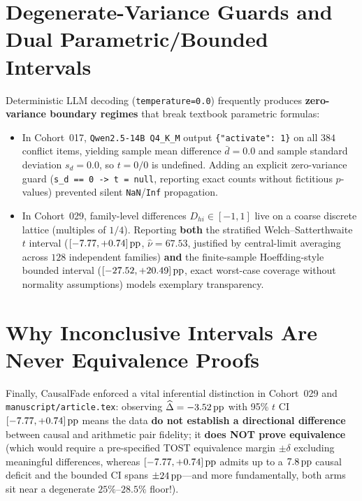 \section{Degenerate-Variance Guards and Dual Parametric/Bounded Intervals}
Deterministic LLM decoding (\texttt{temperature=0.0}) frequently produces \textbf{zero-variance boundary regimes} that break textbook parametric formulas:
\begin{itemize}
  \item In Cohort~017, \texttt{Qwen2.5-14B Q4\_K\_M} output \texttt{\{"activate": 1\}} on all $384$ conflict items, yielding sample mean difference $\bar{d} = 0.0$ and sample standard deviation $s_d = 0.0$, so $t = 0/0$ is undefined. Adding an explicit zero-variance guard (\texttt{s\_d == 0 -> t = null}, reporting exact counts without fictitious $p$-values) prevented silent \texttt{NaN}/\texttt{Inf} propagation.
  \item In Cohort~029, family-level differences $D_{hi} \in [-1, 1]$ live on a coarse discrete lattice (multiples of $1/4$). Reporting \textbf{both} the stratified Welch--Satterthwaite $t$ interval ($[-7.77, +0.74]\,\mathrm{pp}$, $\hat{\nu}=67.53$, justified by central-limit averaging across $128$ independent families) \textbf{and} the finite-sample Hoeffding-style bounded interval ($[-27.52, +20.49]\,\mathrm{pp}$, exact worst-case coverage without normality assumptions) models exemplary transparency.
\end{itemize}

\section{Why Inconclusive Intervals Are Never Equivalence Proofs}
Finally, CausalFade enforced a vital inferential distinction in Cohort~029 and \texttt{manuscript/article.tex}: observing $\widehat{\Delta} = -3.52\,\mathrm{pp}$ with 95\% $t$ CI $[-7.77, +0.74]\,\mathrm{pp}$ means the data \textbf{do not establish a directional difference} between causal and arithmetic pair fidelity; it \textbf{does NOT prove equivalence} (which would require a pre-specified TOST equivalence margin $\pm \delta$ excluding meaningful differences, whereas $[-7.77, +0.74]\,\mathrm{pp}$ admits up to a $7.8\,\mathrm{pp}$ causal deficit and the bounded CI spans $\pm 24\,\mathrm{pp}$---and more fundamentally, both arms sit near a degenerate $25\%$--$28.5\%$ floor!).
